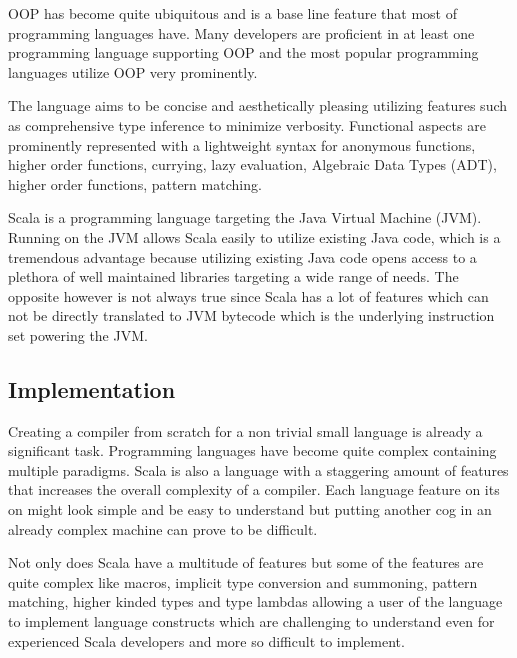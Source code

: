 \documentclass{VUMIFPSbakalaurinis}
\begin{document}
OOP has become quite ubiquitous and is a base line feature that most of programming languages have.
Many developers are proficient in at least one programming language supporting OOP and the most popular programming languages utilize OOP very prominently.

The language aims to be concise and aesthetically pleasing utilizing features such as comprehensive type inference to minimize verbosity.
Functional aspects are prominently represented with a lightweight syntax for anonymous functions, higher order functions, currying, lazy evaluation, Algebraic Data Types (ADT), higher order functions, pattern matching.

Scala is a programming language targeting the Java Virtual Machine (JVM).
Running on the JVM allows Scala easily to utilize existing Java code, which is a tremendous advantage because utilizing existing Java code opens access to a plethora of well maintained libraries targeting a wide range of needs.
The opposite however is not always true since Scala has a lot of features which can not be directly translated to JVM bytecode which is the underlying instruction set powering the JVM.

\subsection{Implementation}
Creating a compiler from scratch for a non trivial small language is already a significant task.
Programming languages have become quite complex containing multiple paradigms.
Scala is also a language with a staggering amount of features that increases the overall complexity of a compiler.
Each language feature on its on might look simple and be easy to understand but putting another cog in an already complex machine can prove to be difficult.

Not only does Scala have a multitude of features but some of the features are quite complex like macros, implicit type conversion and summoning, pattern matching, higher kinded types and type lambdas allowing a user of the language to implement language constructs \cite{Scala2Union, ShapelessGithub} which are challenging to understand even for experienced Scala developers and more so difficult to implement.
\end{document}
